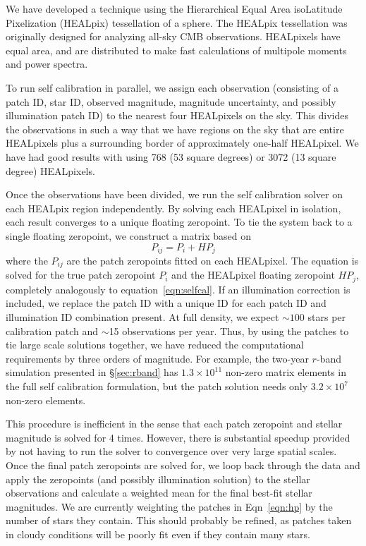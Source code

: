 \documentclass[12pt,preprint]{aastex}
\begin{document}
We have developed a technique using the Hierarchical Equal Area isoLatitude Pixelization (HEALpix) tessellation of a sphere.  The HEALpix tessellation was originally designed for analyzing all-sky CMB observations.  HEALpixels have equal area, and are distributed to make fast calculations of multipole moments and power spectra.  

To run self calibration in parallel, we assign each observation (consisting of a patch ID, star ID, observed magnitude, magnitude uncertainty, and possibly illumination patch ID) to the nearest four HEALpixels on the sky.  This divides the observations in such a way that we have regions on the sky that are entire HEALpixels plus a surrounding border of approximately one-half HEALpixel.  We have had good results with using 768 (53 square degrees) or 3072 (13 square degree) HEALpixels.  

Once the observations have been divided, we run the self calibration solver on each HEALpix region independently.  By solving each HEALpixel in isolation, each result converges to a unique floating zeropoint.  To tie the system back to a single floating zeropoint, we construct a matrix based on
\begin{equation}\label{eqn:hp}
P_{ij} = P_{i} + HP_{j}
\end{equation}
where the $P_{ij}$ are the patch zeropoints fitted on each HEALpixel.  The equation is solved for the true patch zeropoint $P_{i}$ and the HEALpixel floating zeropoint $HP_{j}$, completely analogously to equation~\ref{eqn:selfcal}.  If an illumination correction is included, we replace the patch ID with a unique ID for each patch ID and illumination ID combination present.  At full density, we expect $\sim100$ stars per calibration patch and $\sim$15 observations per year.  Thus, by using the patches to tie large scale solutions together, we have reduced the computational requirements by three orders of magnitude.  For example, the two-year $r$-band simulation presented in \S\ref{sec:rband} has $1.3\times 10^{11}$  non-zero matrix elements in the full self calibration formulation, but the patch solution needs only $3.2 \times 10^7$ non-zero elements.  

This procedure is inefficient in the sense that each patch zeropoint and stellar magnitude is solved for 4 times.  However, there is substantial speedup provided by not having to run the solver to convergence over very large spatial scales.  Once the final patch zeropoints are solved for, we loop back through the data and apply the zeropoints (and possibly illumination solution) to the stellar observations and calculate a weighted mean for the final best-fit stellar magnitudes.  We are currently weighting the patches in Eqn~\ref{eqn:hp} by the number of stars they contain.  This should probably be refined, as patches taken in cloudy conditions will be poorly fit even if they contain many stars.  
\end{document}
